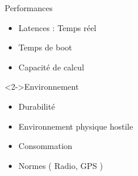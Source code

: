 \begin{frame}[t]
	\begin{block}{Performances}
		\begin{itemize}
			\item Latences : Temps réel
			\item Temps de boot
			\item Capacité de calcul
		\end{itemize}
	\end{block}
	\begin{block}<2->{Environnement}
		\begin{itemize}
			\item Durabilité
			\item Environnement physique hostile
			\item Consommation
			\item Normes ( Radio, GPS )
		\end{itemize}
	\end{block}
\end{frame}

